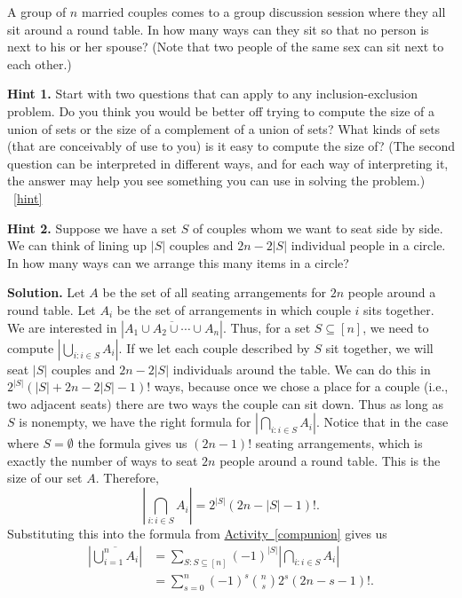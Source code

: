 \documentclass{book}
\begin{document}
\setcounter{project}{226}
\addtocounter{project}{-1}
\begin{activity}[]\label{relaxedmenage}
\hypertarget{p-1249}{}%
A group of \(n\) married couples comes to a group discussion session where they all sit around a round table. In how many ways can they sit so that no person is next to his or her spouse? (Note that two people of the same sex can sit next to each other.)%
\par\smallskip%
\noindent\textbf{Hint 1.}\hypertarget{hint-146}{}\quad%
\hypertarget{p-1250}{}%
Start with two questions that can apply to any inclusion-exclusion problem. Do you think you would be better off trying to compute the size of a union of sets or the size of a complement of a union of sets? What kinds of sets (that are conceivably of use to you) is it easy to compute the size of? (The second question can be interpreted in different ways, and for each way of interpreting it, the answer may help you see something you can use in solving the problem.)%
~\hfill{\tiny\hyperlink{a-226}{[hint]}\hypertarget{q-226}{}}\par\smallskip%
\noindent\textbf{Hint 2.}\hypertarget{hint-147}{}\quad%
\hypertarget{p-1251}{}%
Suppose we have a set \(S\) of couples whom we want to seat side by side. We can think of lining up \(|S|\) couples and \(2n - 2|S|\) individual people in a circle.  In how many ways can we arrange this many items in a circle?%
\par\smallskip%
\noindent\textbf{Solution.}\hypertarget{solution-147}{}\quad%
\hypertarget{p-1252}{}%
Let \(A\) be the set of all seating arrangements for \(2n\) people around a round table. Let \(A_i\) be the set of arrangements in which couple \(i\) sits together. We are interested in \(|\overline{A_1\cup A_2\cup \cdots \cup A_n}|\). Thus, for a set \(S\subseteq [n]\), we need to compute \(\left|\bigcup_{i\colon i\in S} A_i\right|\). If we let each couple described by \(S\) sit together, we will seat \(|S|\) couples and \(2n-2|S|\) individuals around the table. We can do this in \(2^{|S|}(|S| + 2n-2 |S|-1)!\) ways, because once we chose a place for a couple (i.e.\@, two adjacent seats) there are two ways the couple can sit down. Thus as long as \(S\) is nonempty, we have the right formula for \(\left|\bigcap_{i\colon i\in S} A_i\right|\). Notice that in the case where \(S=\emptyset\) the formula gives us \((2n-1)!\) seating arrangements, which is exactly the number of ways to seat \(2n\) people around a round table. This is the size of our set \(A\). Therefore,%
\begin{equation*}
\left|\bigcap_{i\colon i\in S} A_i\right| = 2^{|S|}(2n-|S|-1)!\text{.}
\end{equation*}
Substituting this into the formula from \hyperref[compunion]{Activity~\ref{compunion}} gives us%
\begin{align*}
\left|\overline{\bigcup_{i=1}^n A_i}\right| &=  \sum_{S:S\subseteq [n]}
(-1)^{|S|} \left|\bigcap_{i\colon i\in S} A_i\right|\\
&= \sum_{s=0}^n(-1)^s\binom{n}{s}2^{s}(2n- s-1)!\text{.}
\end{align*}
%
\end{activity}
\end{document}
